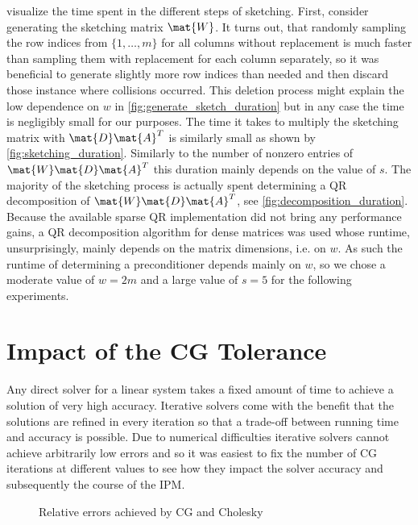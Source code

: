  visualize the time spent in the different steps of sketching.
First, consider generating the sketching matrix \(\mat{W}\).
It turns out, that randomly sampling the row indices from \(\{1, \ldots, m\}\) for all columns without replacement is much faster than sampling them with replacement for each column separately, so it was beneficial to generate slightly more row indices than needed and then discard those instance where collisions occurred.
This deletion process might explain the low dependence on \(w\) in \cref{fig:generate_sketch_duration} but in any case the time is negligibly small for our purposes.
The time it takes to multiply the sketching matrix with \(\mat{D}\mat{A}^T\) is similarly small as shown by \cref{fig:sketching_duration}.
Similarly to the number of nonzero entries of \(\mat{W}\mat{D}\mat{A}^T\) this duration mainly depends on the value of \(s\).
The majority of the sketching process is actually spent determining a QR decomposition of \(\mat{W}\mat{D}\mat{A}^T\), see \cref{fig:decomposition_duration}.
Because the available sparse QR implementation did not bring any performance gains, a QR decomposition algorithm for dense matrices was used whose runtime, unsurprisingly, mainly depends on the matrix dimensions, i.e. on \(w\).
As such the runtime of determining a preconditioner depends mainly on \(w\), so we chose a moderate value of \(w=2m\) and a large value of \(s=5\) for the following experiments.

\section{Impact of the CG Tolerance}

Any direct solver for a linear system takes a fixed amount of time to achieve a solution of very high accuracy.
Iterative solvers come with the benefit that the solutions are refined in every iteration so that a trade-off between running time and accuracy is possible.
Due to numerical difficulties iterative solvers cannot achieve arbitrarily low errors and so it was easiest to fix the number of CG iterations at different values to see how they impact the solver accuracy and subsequently the course of the IPM.

\begin{figure}[tbp]
  \centering%
  \caption{Relative errors achieved by CG and Cholesky}%
  \label{fig:residual_norms}
\end{figure}

